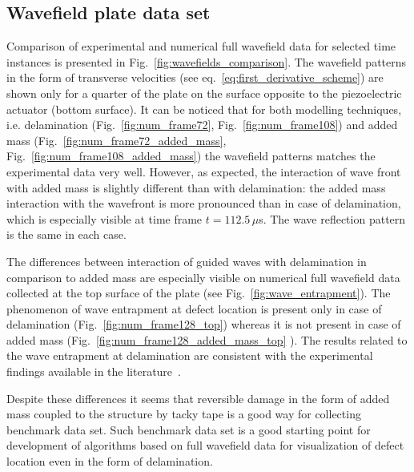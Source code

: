 \documentclass[preprint,12pt]{elsarticle}
\begin{document}
	\subsection{Wavefield plate data set }
	Comparison of experimental and numerical full wavefield data for selected time instances is presented in Fig.~\ref{fig:wavefields_comparison}. The wavefield patterns in the form of transverse velocities (see eq.~\ref{eq:first_derivative_scheme}) are shown only for a quarter of the plate on the surface opposite to the piezoelectric actuator (bottom surface). It can be noticed that for both modelling techniques, i.e. delamination (Fig.~\ref{fig:num_frame72}, Fig.~\ref{fig:num_frame108}) and added mass (Fig.~\ref{fig:num_frame72_added_mass}, Fig.~\ref{fig:num_frame108_added_mass})	the wavefield patterns matches the experimental data very well. However, as expected, the interaction of wave front with added mass is slightly different than with delamination: the added mass interaction with the wavefront is more pronounced than in case of delamination, which is especially visible at time frame $t=112.5\,  \mu$s. The wave reflection pattern is the same in each case.
	
	The differences between interaction of guided waves with delamination in comparison to added mass are especially visible on numerical full wavefield data collected at the top surface of the plate (see Fig.~\ref{fig:wave_entrapment}). The phenomenon of wave entrapment at defect location is present only in case of delamination (Fig.~\ref{fig:num_frame128_top}) whereas it is not present in case of added mass (Fig.~\ref{fig:num_frame128_added_mass_top} ). The results related to the wave entrapment at delamination are consistent with the experimental findings available in the literature~\cite{Glushkov2012}. 
	
	Despite these differences it seems that reversible damage in the form of added mass coupled to the structure by tacky tape is a good way for collecting benchmark data set. Such benchmark data set is a good starting point for development of algorithms based on full wavefield data for visualization of defect location even in the form of delamination.
	
\end{document}
